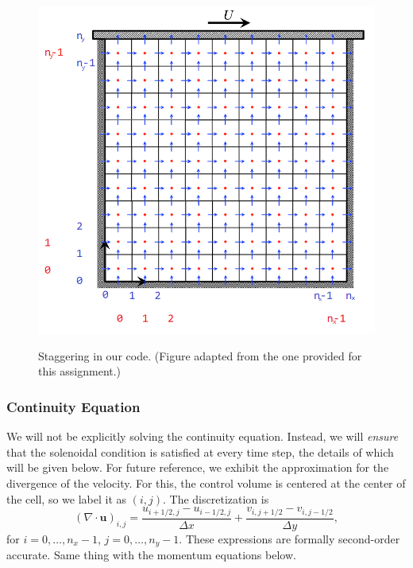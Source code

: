 \documentclass[11pt]{article}
\begin{document}
\begin{center}
\begin{figure}[ht!]
\begin{minipage}{12cm}\label{staggering}
\includegraphics[width=12cm]{staggering.png}
\end{minipage}
\caption{Staggering in our code. (Figure adapted from the one provided for this assignment.)}
\end{figure}
\end{center}

\subsubsection{Continuity Equation}

We will not be explicitly solving the continuity equation. Instead, we will \emph{ensure} that the solenoidal condition is satisfied at every time step, the details of which will be given below. For future reference, we exhibit the approximation for the divergence of the velocity. For this, the control volume is centered at the center of the cell, so we label it as $(i,j)$. The discretization is
\begin{equation}\label{contin}
(\nabla\cdot\mathbf u)_{i,j} = \frac{u_{i+1/2,j} - u_{i-1/2,j}}{\Delta x} + \frac{v_{i,j+1/2} - v_{i,j-1/2}}{\Delta y},
\end{equation}
for $i = 0,\hdots,n_x-1$, $j = 0,\hdots,n_y-1$. These expressions are formally second-order accurate. Same thing with the momentum equations below. 
\end{document}
